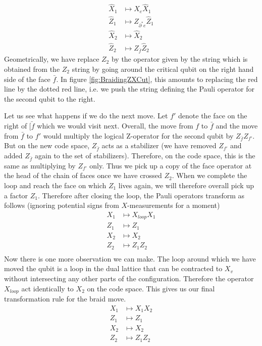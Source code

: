 \documentclass[a4paper, draft]{article}
\theoremstyle{own}
\theoremstyle{remark}
\begin{document}
\begin{align*}
\hat{X}_1 &\mapsto  X_e \hat{X}_1 \\
\hat{Z}_1 &\mapsto Z_{\partial^* e} \hat{Z}_1 \\
\hat{X}_2 &\mapsto   \hat{X}_2 \\
\hat{Z}_2 &\mapsto   Z_{\bar{f}} \hat{Z}_2 
\end{align*}
Geometrically, we have replace $Z_2$ by the operator given by the string which is obtained from the $Z_2$ string by going around the critical qubit on the right hand side of the face $\bar{f}$. In figure \ref{fig:BraidingZXCut}, this amounts to replacing the red line by the dotted red line, i.e. we push the string defining the Pauli operator for the second qubit to the right. 

Let us see what happens if we do the next move. Let $f'$ denote the face on the right of $\bar{[f}$ which we would visit next. Overall, the move from $f$ to $\bar{f}$ and the move from $\bar{f}$ to $f'$ would multiply the logical Z-operator for the second qubit by $Z_{\bar{f}} Z_{f'}$. But on the new code space, $Z_{\bar{f}}$ acts as a stabilizer (we have removed $Z_{f'}$ and added $Z_{\bar{f}}$ again to the set of stabilizers). Therefore, on the code space, this is the same as multiplying by $Z_{f'}$ only. Thus we pick up a copy of the face operator at the head of the chain of faces once we have crossed $Z_2$. When we complete the loop and reach the face on which $Z_1$ lives again, we will therefore overall pick up a factor $Z_1$. Therefore after closing the loop, the Pauli operators transform as follows (ignoring potential signs from $X$-measurements for a moment)
\begin{align*}
X_1 &\mapsto  X_{loop} X_1 \\
Z_1 &\mapsto Z_1 \\
X_2 &\mapsto   X_2 \\
Z_2 &\mapsto   Z_1 Z_2 \\
\end{align*}
Now there is one more observation we can make. The loop around which we have moved the qubit is a loop in the dual lattice that can be contracted to $X_v$ without intersecting any other parts of the configuration. Therefore the operator $X_{loop}$ act identically to $X_2$ on the code space. This gives us our final transformation rule for the braid move.
\begin{align*}
X_1 &\mapsto  X_1 X_2 \\
Z_1 &\mapsto Z_1 \\
X_2 &\mapsto   X_2 \\
Z_2 &\mapsto   Z_1 Z_2 \\
\end{align*}
\end{document}
